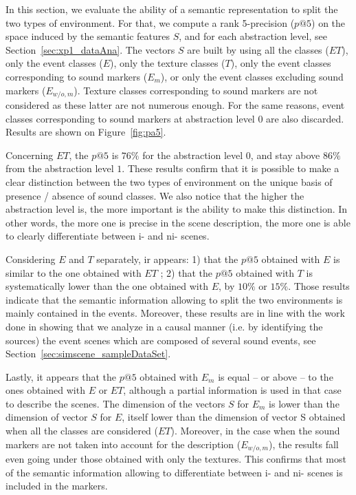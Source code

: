 \documentclass[twoside,twocolumn]{article}
\begin{document}
In this section, we evaluate the ability of a semantic representation to split the two types of environment. For that, we compute a rank 5-precision ($p@5$) on the space induced by the semantic features $S$, and for each abstraction level, see Section~\ref{sec:xp1_dataAna}. The vectors $S$ are built by using all the classes ($ET$), only the event classes ($E$), only the texture classes ($T$), only the event classes corresponding to sound markers ($E_m$), or only the event classes excluding sound markers ($E_{w/o,m}$). Texture classes corresponding to sound markers are not considered as these latter are not numerous enough. For the same reasons, event classes corresponding to sound markers at abstraction level $0$ are also discarded. Results are shown on Figure~\ref{fig:pa5}.

Concerning $ET$, the $p@5$ is $76\%$ for the abstraction level $0$, and stay above $86\%$ from the abstraction level $1$. These results confirm that it is possible to make a clear distinction between the two types of environment on the unique basis of presence / absence of sound classes. We also notice that the higher the abstraction level is, the more important is the ability to make this distinction. In other words, the more one is precise in the scene description, the more one is able to clearly differentiate between i- and ni- scenes.

Considering $E$ and $T$ separately, ir appears: 1) that the $p@5$ obtained with $E$ is similar to the one obtained with $ET$ ; 2) that the $p@5$ obtained with $T$ is systematically lower than the one obtained with $E$, by $10\%$ or $15\%$. Those results indicate that the semantic information allowing to split the two environments is mainly contained in the events. Moreover, these results are in line with the work done in \cite{maffiolo_caracterisation_1999} showing that we analyze in a causal manner (i.e. by identifying the sources) the event scenes which are composed of several sound events, see Section~\ref{sec:simscene_sampleDataSet}.

Lastly, it appears that the $p@5$ obtained with $E_m$ is equal – or above – to the ones obtained with $E$ or $ET$, although a partial information is used in that case to describe the scenes. The dimension of the vectors $S$ for $E_m$ is lower than the dimension of vector $S$ for $E$, itself lower than the dimension of vector S obtained when all the classes are considered ($ET$). Moreover, in the case when the sound markers are not taken into account for the description ($E_{w/o,m}$), the results fall even going under those obtained with only the textures. This confirms that most of the semantic information allowing to differentiate between i- and ni- scenes is included in the markers.
\end{document}
